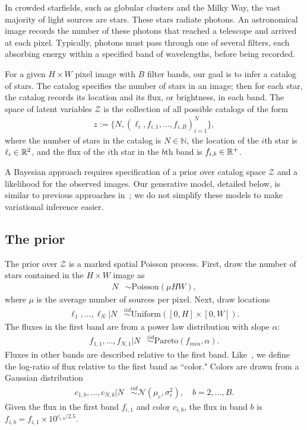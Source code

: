 In crowded starfields, such as globular clusters and the Milky Way, the vast majority of light sources are stars.
These stars radiate photons. 
An astronomical image records the number of these photons that reached a telescope and arrived at each pixel. Typically, photons must pass through one of several filters, each absorbing energy within a specified band of wavelengths, before being recorded.

For a given $H \times W$ pixel image with $B$ filter bands, our goal is to infer a catalog of 
stars. 
The catalog specifies the number of stars 
in an image; then for each star, the catalog 
records its location and its flux, or brightness,
in each band. 
The space of latent variables 
$\mathcal{Z}$ is the collection of all possible catalogs of the form
\begin{align}
    z := \{N, (\ell_i, f_{i,1}, ..., f_{i,B})_{i = 1}^N\},
    \label{eq:cat_formulation}
\end{align}
where the number of stars in the catalog
is $N\in\mathbb{N}$,
the location of the $i$th star is $\ell_i \in \mathbb{R}^2$, and 
the flux of the $i$th star in the $b$th band is $f_{i, b}\in\mathbb{R}^+$. 

A Bayesian approach requires specification of a prior over catalog space $\mathcal{Z}$ and a likelihood for the observed images. Our generative model, detailed below, is similar to previous approaches in~\cite{Portillo_2017, Brewer_2013, Feder_2019, regier2019_celeste};
we do not simplify these models to make variational inference easier.

\subsection{The prior}
The prior over $\mathcal{Z}$ is a marked spatial Poisson process. First, draw the number of stars contained in the $H\times W$ image as
\begin{align}
	N &\sim \text{Poisson}(\mu HW),
	\label{eq:n_prior}
\end{align}
where $\mu$ is the average number of sources per pixel.
Next, draw locations
\begin{align}
  \ell_1, ..., \ell_N | N &\stackrel{iid}{\sim} \text{Uniform}([0, H] \times [0, W]). 
 \end{align}
The fluxes in the first band are from a power law distribution with slope $\alpha$:
\begin{align}
    f_{1, 1}, ..., f_{N,1} | N & 
    \stackrel{iid}{\sim} \text{Pareto}(f_{min}, \alpha) 
    \label{eq:flux_prior}.
\end{align}
Fluxes in other bands are described relative to the first band. Like~\cite{Feder_2019}, we define the log-ratio of flux relative to the first band as ``color." Colors are drawn from a Gaussian distribution
\begin{align}
  c_{1, b}, ..., c_{N,b} | N  & 
      \stackrel{iid}{\sim} \mathcal{N}(\mu_c, \sigma^2_c), \quad b = 2, ..., B.
\end{align}
Given the flux in the first band $f_{i,1}$ and color $c_{i,b}$,
the flux in band $b$ is  $f_{i,b} = f_{i,1} \times 10^{c_{i,b} / 2.5}$.

